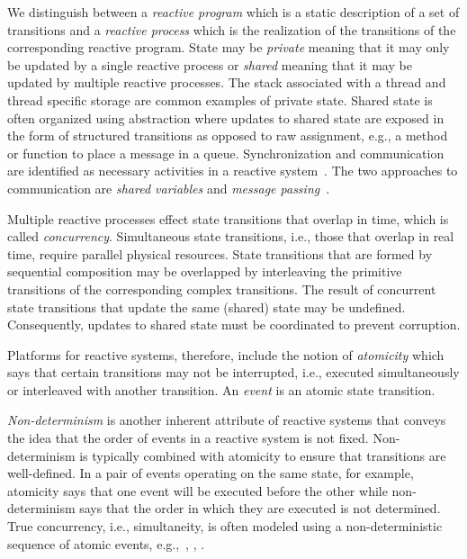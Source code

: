 We distinguish between a \emph{reactive program} which is a static description of a set of transitions and a \emph{reactive process} which is the realization of the transitions of the corresponding reactive program.
State may be \emph{private} meaning that it may only be updated by a single reactive process or \emph{shared} meaning that it may be updated by multiple reactive processes.
The stack associated with a thread and thread specific storage are common examples of private state.
Shared state is often organized using abstraction where updates to shared state are exposed in the form of structured transitions as opposed to raw assignment, e.g., a method or function to place a message in a queue.
Synchronization and communication are identified as necessary activities in a reactive system~\cite{andrews1983concepts}.
The two approaches to communication are \emph{shared variables} and \emph{message passing}~\cite{andrews1983concepts}.

Multiple reactive processes effect state transitions that overlap in time, which is called \emph{concurrency}.
Simultaneous state transitions, i.e., those that overlap in real time, require parallel physical resources.
State transitions that are formed by sequential composition may be overlapped by interleaving the primitive transitions of the corresponding complex transitions.
The result of concurrent state transitions that update the same (shared) state may be undefined.
Consequently, updates to shared state must be coordinated to prevent corruption.

Platforms for reactive systems, therefore, include the notion of \emph{atomicity} which says that certain transitions may not be interrupted, i.e., executed simultaneously or interleaved with another transition.
An \emph{event} is an atomic state transition.

\emph{Non-determinism} is another inherent attribute of reactive systems that conveys the idea that the order of events in a reactive system is not fixed.
Non-determinism is typically combined with atomicity to ensure that transitions are well-defined.
In a pair of events operating on the same state, for example, atomicity says that one event will be executed before the other while non-determinism says that the order in which they are executed is not determined.
True concurrency, i.e., simultaneity, is often modeled using a non-deterministic sequence of atomic events, e.g.,~\cite{nancy1996distributed}, \cite{chandy1989parallel}, \cite{manna1992temporal}.

